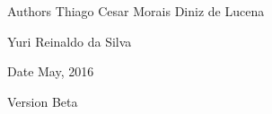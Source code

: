 \begin{DoxyAuthor}{Authors}
Thiago Cesar Morais Diniz de Lucena 

Yuri Reinaldo da Silva 
\end{DoxyAuthor}
\begin{DoxyDate}{Date}
May, 2016 
\end{DoxyDate}
\begin{DoxyVersion}{Version}
Beta 
\end{DoxyVersion}
